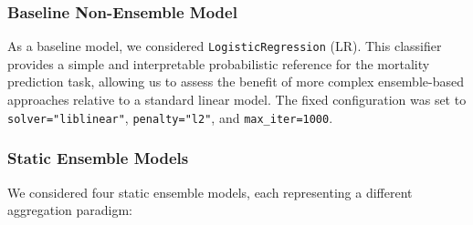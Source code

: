 \documentclass[conference]{IEEEtran}
\begin{document}
\subsubsection{Baseline Non-Ensemble Model}

As a baseline model, we considered \texttt{LogisticRegression} (LR). This classifier provides a simple and interpretable probabilistic reference for the mortality prediction task, allowing us to assess the benefit of more complex ensemble-based approaches relative to a standard linear model. The fixed configuration was set to \texttt{solver="liblinear"}, \texttt{penalty="l2"}, and \texttt{max\_iter=1000}.

\subsubsection{Static Ensemble Models}
We considered four static ensemble models, each representing a different aggregation paradigm:
\end{document}
